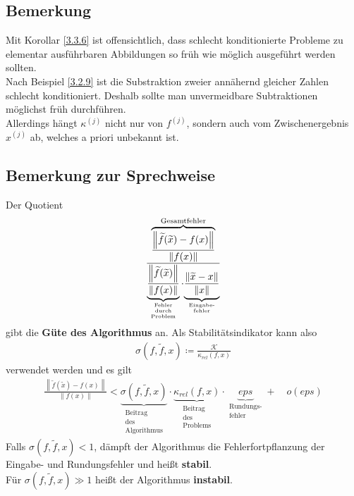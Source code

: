 \documentclass[ngerman,fontsize=11pt, paper=a4, parskip=half, titlepage=true, toc=bib]{scrbook}
\newcommand{\K}{\mathcal{K}}
\newcommand{\nn}[1]{\left\| #1 \right\|}
\begin{document}
  \subsection{Bemerkung}
  Mit Korollar \ref{3.3.6} ist offensichtlich, dass schlecht konditionierte Probleme 
  zu elementar ausführbaren Abbildungen so früh wie möglich ausgeführt werden sollten. \\
  Nach Beispiel \ref{3.2.9} ist die Substraktion zweier annähernd gleicher Zahlen schlecht konditioniert.
  Deshalb sollte man unvermeidbare Subtraktionen möglichst früh durchführen. \\
  Allerdings hängt $\kappa^{(j)}$ nicht nur von $f^{(j)}$, sondern auch vo\nocite{*}m Zwischenergebnis $x^{(j)}$ ab, welches a priori unbekannt ist.

  \subsection{Bemerkung zur Sprechweise} %
  Der Quotient 
  \begin{gather}
    \frac{\overbrace{\frac{\nn{\widetilde{f}(\widetilde{x})-f(x)}}{\nn{f(x)}}}^{
        \text{Gesamtfehler}}}
    {\underbrace{\frac{\nn{\widetilde{f}(\widetilde{x})}}{\nn{f(x)}}}_{
        \scriptsize\substack{
          \text{Fehler} \\
          \text{durch} \\
          \text{Problem}
        }}
      \cdot
      {\underbrace{\frac{\nn{\widetilde{x}-x}}{\nn{x}}}_{
          \scriptsize\substack{\text{Eingabe-} \\ \text{fehler}}}}}
    \label{III.3.6}
  \end{gather}
  gibt die \textbf{Güte des Algorithmus}  an.
  Als Stabilitätsindikator kann also 
  \begin{gather}
    \sigma\left(f, \widetilde{f}, x\right) \coloneqq \frac{\K}{\kappa_{rel}(f, x)}
    \label{III.3.7}
  \end{gather}
  verwendet werden und es gilt
  \begin{gather*}
    \frac{\nn{\widetilde{f}(\widetilde{x})-f(x)}}{\nn{f(x)}}
    < \underbrace{\sigma\left( f,\widetilde{f}, x\right) }_{
      \substack{\text{Beitrag}\\
        \text{des} \\
        \text{Algorithmus}}}
    \cdot \underbrace{\kappa_{rel}(f,x)}_{
      \substack{\text{Beitrag} \\
        \text{des} \\
        \text{Problems}}}
    \cdot \underbrace{eps}_{\substack{\text{Rundungs-}\\\text{fehler}}}
    + \quad o(eps)
  \end{gather*}
  Falls $\sigma( f,\widetilde{f}, x)  < 1$, dämpft der Algorithmus die Fehlerfortpflanzung der Eingabe- und Rundungsfehler und heißt \textbf{stabil}. \\
  Für $\sigma( f,\widetilde{f}, x)  \gg 1$ heißt der Algorithmus \textbf{instabil}.
\end{document}
